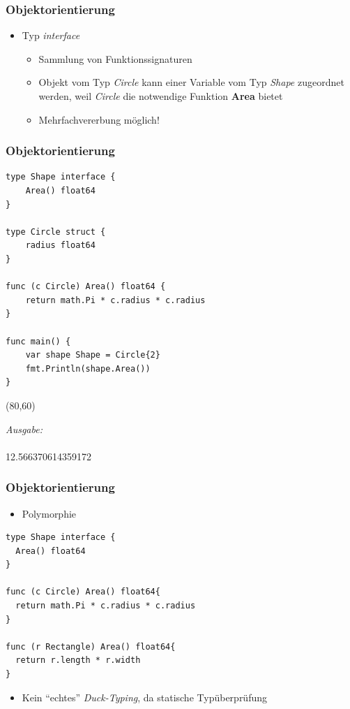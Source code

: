 \documentclass{beamer}
\begin{document}
\begin{frame}
\frametitle{Objektorientierung}

\begin{itemize}
\item Typ \textit{interface}
\begin{itemize}
\setlength{\itemsep}{24pt}
\item Sammlung von Funktionssignaturen
\item Objekt vom Typ \textit{Circle} kann einer Variable vom Typ \textit{Shape} zugeordnet werden, weil \textit{Circle} die notwendige Funktion \textbf{Area} bietet
\item Mehrfachvererbung m\"oglich!
\end{itemize}
\end{itemize}

\end{frame}

\begin{frame}[fragile]
\frametitle{Objektorientierung}

\begin{lstlisting}
type Shape interface {
    Area() float64
}

type Circle struct {
    radius float64
}

func (c Circle) Area() float64 {
	return math.Pi * c.radius * c.radius
}

func main() {
    var shape Shape = Circle{2}
    fmt.Println(shape.Area())
}
\end{lstlisting}

\begin{textblock}{42}(80,60)
\begin{tcolorbox}
\textit{Ausgabe:\\}\\
12.566370614359172
\end{tcolorbox}
\end{textblock}

\end{frame}

\begin{frame}[fragile]
\frametitle{Objektorientierung}

\begin{itemize}
\item Polymorphie
\end{itemize}

\begin{lstlisting}
type Shape interface {
  Area() float64
}

func (c Circle) Area() float64{
  return math.Pi * c.radius * c.radius
}

func (r Rectangle) Area() float64{
  return r.length * r.width
}
\end{lstlisting}

\begin{itemize}
\setlength{\itemsep}{24pt}
\item Kein ``echtes'' \textit{Duck-Typing}, da statische Typ\"uberpr\"ufung
\end{itemize}

\end{frame}
\end{document}
